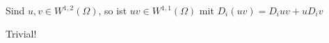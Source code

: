 \begin{exercise}

Sind $u,v \in W^{1,2}(\Omega)$, so ist $uv \in W^{1,1}(\Omega)$ mit $D_i(uv) = D_iuv + uD_iv$

\end{exercise}

\begin{solution}

Trivial!

\end{solution}
